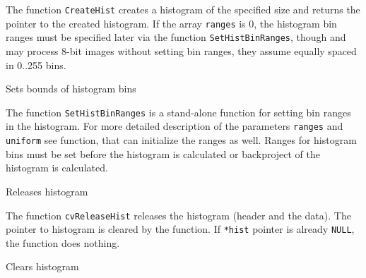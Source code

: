 The function \texttt{CreateHist} creates a histogram of the specified size and returns the pointer to the created histogram. If the array \texttt{ranges} is 0, the histogram bin ranges must be specified later via the function \texttt{SetHistBinRanges}, though  and  may process 8-bit images without setting bin ranges, they assume equally spaced in 0..255 bins.

\label{SetHistBinRanges}

Sets bounds of histogram bins


\begin{description}
\end{description}

The function \texttt{SetHistBinRanges} is a stand-alone function for setting bin ranges in the histogram. For more detailed description of the parameters \texttt{ranges} and \texttt{uniform} see  function, that can initialize the ranges as well. Ranges for histogram bins must be set before the histogram is calculated or backproject of the histogram is calculated.


\label{ReleaseHist}

Releases histogram


\begin{description}
\end{description}

The function \texttt{cvReleaseHist} releases the histogram (header and the data). The pointer to histogram is cleared by the function. If \texttt{*hist} pointer is already \texttt{NULL}, the function does nothing.

\label{ClearHist}

Clears histogram


\begin{description}
\end{description}

